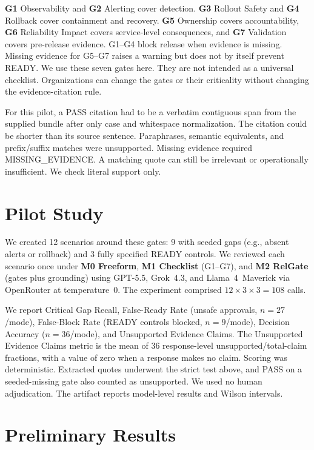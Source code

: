 \documentclass[conference]{IEEEtran}
\begin{document}
\textbf{G1} Observability and \textbf{G2} Alerting cover detection. \textbf{G3} Rollout Safety and \textbf{G4} Rollback cover containment and recovery.
\textbf{G5} Ownership covers accountability, \textbf{G6} Reliability Impact covers service-level consequences, and \textbf{G7} Validation covers pre-release evidence.
G1--G4 block release when evidence is missing. Missing evidence for G5--G7 raises a warning but does not by itself prevent READY.
We use these seven gates here. They are not intended as a universal checklist. Organizations can change the gates or their criticality without changing the evidence-citation rule.

For this pilot, a PASS citation had to be a verbatim contiguous span from the supplied bundle after only case and whitespace normalization.
The citation could be shorter than its source sentence. Paraphrases, semantic equivalents, and prefix/suffix matches were unsupported. Missing evidence required MISSING\_EVIDENCE.
A matching quote can still be irrelevant or operationally insufficient. We check literal support only.

\section{Pilot Study}

We created 12 scenarios around these gates: 9 with seeded gaps (e.g., absent alerts or rollback) and 3 fully specified READY controls.
We reviewed each scenario once under \textbf{M0 Freeform}, \textbf{M1 Checklist} (G1--G7), and \textbf{M2 RelGate} (gates plus grounding) using GPT-5.5, Grok~4.3, and Llama~4~Maverick via OpenRouter at temperature~0. The experiment comprised $12\times3\times3=108$ calls.

We report Critical Gap Recall, False-Ready Rate (unsafe approvals, $n{=}27$/mode), False-Block Rate (READY controls blocked, $n{=}9$/mode), Decision Accuracy ($n{=}36$/mode), and Unsupported Evidence Claims.
The Unsupported Evidence Claims metric is the mean of 36 response-level unsupported/total-claim fractions, with a value of zero when a response makes no claim.
Scoring was deterministic. Extracted quotes underwent the strict test above, and PASS on a seeded-missing gate also counted as unsupported.
We used no human adjudication. The artifact reports model-level results and Wilson intervals.

\section{Preliminary Results}
\end{document}
